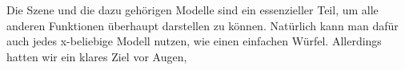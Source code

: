 Die Szene und die dazu gehörigen Modelle sind ein essenzieller Teil, um alle anderen Funktionen überhaupt darstellen zu können. Natürlich kann man dafür auch jedes x-beliebige Modell nutzen, wie einen einfachen Würfel. Allerdings hatten wir ein klares Ziel vor Augen, 